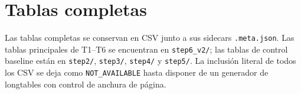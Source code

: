 \chapter{Tablas completas}
Las tablas completas se conservan en CSV junto a sus sidecars \texttt{.meta.json}. Las tablas principales de T1--T6 se encuentran en \texttt{step6\_v2/}; las tablas de control baseline están en \texttt{step2/}, \texttt{step3/}, \texttt{step4/} y \texttt{step5/}. La inclusión literal de todos los CSV se deja como \texttt{NOT\_AVAILABLE} hasta disponer de un generador de longtables con control de anchura de página.
